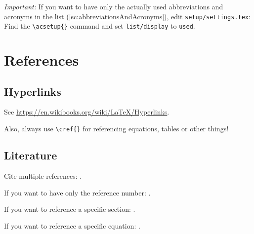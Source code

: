 \emph{Important:} If you want to have only the actually used abbreviations and acronyms
in the list (\cref{sc:abbreviationsAndAcronyms}), edit \verb|setup/settings.tex|: Find
the \verb|\acsetup{}| command and set \verb|list/display| to \texttt{used}.


\section{References}
\subsection{Hyperlinks}
See \url{https://en.wikibooks.org/wiki/LaTeX/Hyperlinks}.

Also, always use \verb|\cref{}| for referencing equations, tables or other things!

\subsection{Literature}
Cite multiple references:
\textcite{Bronstein2012,Follinger2013,Gamma2004,Gantmacher2000a,Gantmacher2000b,%
  Golub2013,Horn2013,LaSalle1961,Mehlhorn2008,Sontag1998,Adamy2009,Horn1994,Watkins2002}.

If you want to have only the reference number:
\cite{Bronstein2012,Follinger2013,Gamma2004,Gantmacher2000a,Gantmacher2000b,Golub2013,%
  Horn2013,LaSalle1961,Mehlhorn2008,Sontag1998,Adamy2009,Horn1994,Watkins2002}.

If you want to reference a specific section: \cite[\S~5.2.2, pp.~248--250]{Golub2013}.

If you want to reference a specific equation: \cite[Eq.~(13.22), p.~721]{Bronstein2012}.

